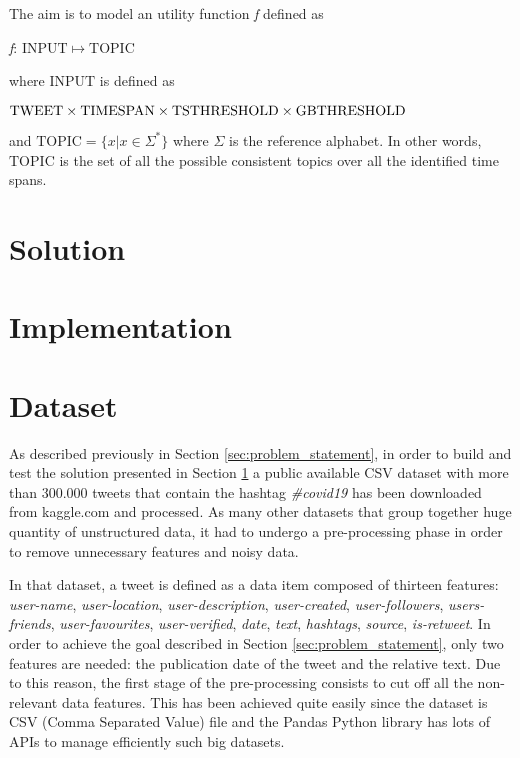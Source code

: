 \noindent The aim is to model an utility function \textit{f} defined as
\begin{center}
	\textit{f}: $\mathrm{INPUT} \mapsto \mathrm{TOPIC}$
\end{center}
where $\mathrm{INPUT}$ is defined as 
\begin{center}
	$\mathrm{TWEET} \times \mathrm{TIMESPAN} \times \mathrm{TS\-THRESHOLD} \times \mathrm{GB\-THRESHOLD}$
\end{center}
 and $\mathrm{TOPIC} = \{x | x \in \Sigma^*\}$ where $\Sigma$ is the reference alphabet. In other words, $\mathrm{TOPIC}$ is the set of all the possible consistent topics over all the identified time spans.

\section{Solution}
\label{sec:solution}


\section{Implementation}
\label{sec:implementation}


\section{Dataset}
\label{sec:dataset}
As described previously in Section \ref{sec:problem_statement}, in order to build and test the solution presented in Section \ref{sec:solution} a public available CSV dataset with more than 300.000 tweets that contain the hashtag \textit{\#covid19} \cite{covid19-tweets-dataset} has been downloaded from kaggle.com and processed. As many other datasets that group together huge quantity of unstructured data, it had to undergo a pre-processing phase in order to remove unnecessary features and noisy data. 

In that dataset, a tweet is defined as a data item composed of thirteen features: \textit{user-name}, \textit{user-location}, \textit{user-description}, \textit{user-created}, \textit{user-followers}, \textit{users-friends}, \textit{user-favourites}, \textit{user-verified}, \textit{date}, \textit{text}, \textit{hashtags}, \textit{source}, \textit{is-retweet}. In order to achieve the goal described in Section \ref{sec:problem_statement}, only two features are needed: the publication date of the tweet and the relative text. Due to this reason, the first stage of the pre-processing consists to cut off all the non-relevant data features. This has been achieved quite easily since the dataset is CSV (Comma Separated Value) file and the Pandas Python library \cite{python-pandas} has lots of APIs to manage efficiently such big datasets.

